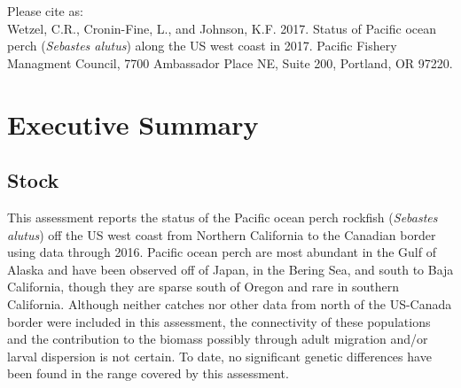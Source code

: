 \documentclass[12pt,]{article}
\begin{document}
\begin{center}
\vspace{.3cm}

\newpage

\vspace{3cm}

Please cite as:\\

Wetzel, C.R., Cronin-Fine, L., and Johnson, K.F. 2017. Status of Pacific ocean perch (\textit{Sebastes alutus}) along the US west coast in 2017. Pacific Fishery Managment Council, 7700 Ambassador Place NE, Suite 200, Portland, OR 97220. 

\vspace{3cm}

\maketitle






\setcounter{page}{1}
\end{center}

{
\setcounter{tocdepth}{4}
\tableofcontents
}
\setlength{\parskip}{5mm plus1mm minus1mm} \pagebreak

\setcounter{page}{1} \renewcommand{\thefigure}{\alph{figure}}
\renewcommand{\thetable}{\alph{table}}

\section*{Executive Summary}\label{executive-summary}

\subsection*{Stock}\label{stock}

This assessment reports the status of the Pacific ocean perch rockfish
(\emph{Sebastes alutus}) off the US west coast from Northern California
to the Canadian border using data through 2016. Pacific ocean perch are
most abundant in the Gulf of Alaska and have been observed off of Japan,
in the Bering Sea, and south to Baja California, though they are sparse
south of Oregon and rare in southern California. Although neither
catches nor other data from north of the US-Canada border were included
in this assessment, the connectivity of these populations and the
contribution to the biomass possibly through adult migration and/or
larval dispersion is not certain. To date, no significant genetic
differences have been found in the range covered by this assessment.
\end{document}
